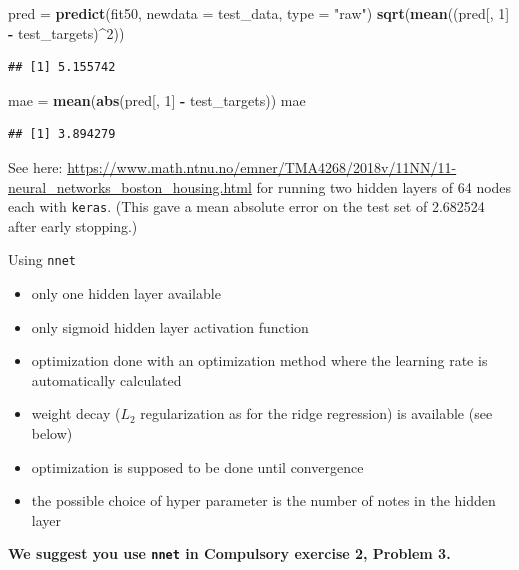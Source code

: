 \documentclass[10pt,ignorenonframetext,]{beamer}
\newenvironment{Shaded}{\begin{snugshade}}{\end{snugshade}}
\newcommand{\KeywordTok}[1]{\textcolor[rgb]{0.13,0.29,0.53}{\textbf{#1}}}
\newcommand{\DataTypeTok}[1]{\textcolor[rgb]{0.13,0.29,0.53}{#1}}
\newcommand{\DecValTok}[1]{\textcolor[rgb]{0.00,0.00,0.81}{#1}}
\newcommand{\StringTok}[1]{\textcolor[rgb]{0.31,0.60,0.02}{#1}}
\newcommand{\OperatorTok}[1]{\textcolor[rgb]{0.81,0.36,0.00}{\textbf{#1}}}
\newcommand{\NormalTok}[1]{#1}
\providecommand{\tightlist}{%
  \setlength{\itemsep}{0pt}\setlength{\parskip}{0pt}}
\begin{document}
\begin{frame}[fragile]
\begin{Shaded}
\begin{Highlighting}[]
\NormalTok{pred =}\StringTok{ }\KeywordTok{predict}\NormalTok{(fit50, }\DataTypeTok{newdata =}\NormalTok{ test_data, }\DataTypeTok{type =} \StringTok{"raw"}\NormalTok{)}
\KeywordTok{sqrt}\NormalTok{(}\KeywordTok{mean}\NormalTok{((pred[, }\DecValTok{1}\NormalTok{] }\OperatorTok{-}\StringTok{ }\NormalTok{test_targets)}\OperatorTok{^}\DecValTok{2}\NormalTok{))}
\end{Highlighting}
\end{Shaded}

\begin{verbatim}
## [1] 5.155742
\end{verbatim}

\begin{Shaded}
\begin{Highlighting}[]
\NormalTok{mae =}\StringTok{ }\KeywordTok{mean}\NormalTok{(}\KeywordTok{abs}\NormalTok{(pred[, }\DecValTok{1}\NormalTok{] }\OperatorTok{-}\StringTok{ }\NormalTok{test_targets))}
\NormalTok{mae}
\end{Highlighting}
\end{Shaded}

\begin{verbatim}
## [1] 3.894279
\end{verbatim}

See here:
\url{https://www.math.ntnu.no/emner/TMA4268/2018v/11NN/11-neural_networks_boston_housing.html}
for running two hidden layers of 64 nodes each with \texttt{keras}.
(This gave a mean absolute error on the test set of 2.682524 after early
stopping.)

\end{frame}

\begin{frame}[fragile]

\begin{block}{Using \texttt{nnet}}

\begin{itemize}
\tightlist
\item
  only one hidden layer available
\item
  only sigmoid hidden layer activation function
\item
  optimization done with an optimization method where the learning rate
  is automatically calculated
\item
  weight decay (\(L_2\) regularization as for the ridge regression) is
  available (see below)
\item
  optimization is supposed to be done until convergence
\item
  the possible choice of hyper parameter is the number of notes in the
  hidden layer
\end{itemize}

\textbf{We suggest you use \texttt{nnet} in Compulsory exercise 2,
Problem 3.}

\end{block}

\end{frame}
\end{document}
